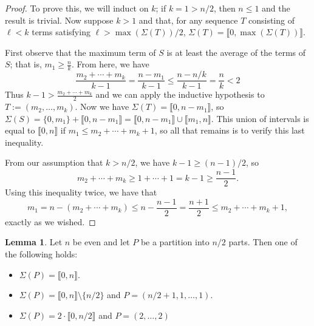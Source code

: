 \documentclass{report}
\newcommand{\llb}{\llbracket}
\newcommand{\rrb}{\rrbracket}
\renewcommand{\:}{\text{:}}
\theoremstyle{definition}
\newtheorem{lemma}[defn]{Lemma}
\begin{document}
\begin{proof}
	To prove this, we will induct on $k$; if $k=1 > n/2$, then $n \le 1$ and the result is trivial.
	Now suppose $k > 1$ and that, for any sequence $T$ consisting of $\ell < k$ terms satisfying $\ell > \max(\Sigma(T))/2$, $\Sigma(T) = \llb 0, \max(\Sigma(T)) \rrb$.
	
	First observe that the maximum term of $S$ is at least the average of the terms of $S$; that is, $m_1 \ge \frac{n}{k}$.
	From here, we have
	\[ \frac{m_2+\cdots + m_k}{k-1} = \frac{n-m_1}{k-1} \le \frac{n-n/k}{k-1} = \frac{n}{k} < 2 \]
	Thus $k - 1 > \frac{m_2+\cdots+m_k}{2}$ and we can apply the inductive hypothesis to $T := (m_2,\dots, m_k)$.
	Now we have $\Sigma(T) = \llb 0, n-m_1 \rrb$, so $\Sigma(S) = \{0,m_1\} + \llb 0,n-m_1 \rrb = \llb 0,n-m_1 \rrb \cup \llb m_1,n \rrb$.
	This union of intervals is equal to $\llb 0,n \rrb$ if $m_1 \le m_2 + \cdots + m_k +1$, so all that remains is to verify this last inequality.
	
	From our assumption that $k > n/2$, we have $k-1 \ge (n-1)/2$, so 
	\[m_2 + \cdots + m_k \ge 1 +\cdots + 1 = k-1 \ge \frac{n-1}{2}.\]
	Using this inequality twice, we have that
	\[m_1 = n - (m_2 + \cdots + m_k) \le n - \frac{n-1}{2} = \frac{n+1}{2} \le m_2 + \cdots + m_k + 1,\]
	exactly as we wished.
\end{proof}

\begin{lemma} \label{lem:n/2-partitions}
	Let $n$ be even and let $P$ be a partition into $n/2$ parts.
	Then one of the following holds:
	\begin{itemize}
		\item $\Sigma(P) = \llb 0, n \rrb$.
		\item $\Sigma(P) = \llb 0,n \rrb\setminus\{n/2\}$ and $P = (n/2+1,1,\dots,1)$.
		\item $\Sigma(P) = 2\cdot \llb 0, n/2 \rrb$ and $P = (2,\dots, 2)$
	\end{itemize}
\end{lemma}
\end{document}

